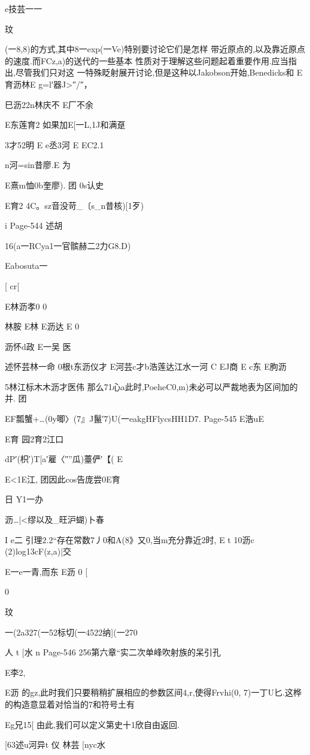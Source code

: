 {{e技芸一一

玟

(一8,8)的方式,其中8一exp(一Ve)特别要讨论它们是怎样
带近原点的,以及靠近原点的速度.而FCz,a)的送代的一些基本
性质对于理解这些问题起着重要作用.应当指出,尽管我们只对这
一特殊眨射展开讨论,但是这种以Jakobson开始,Benedicks和
E育沥林E
g=l′器J>″/″，

巳沥22n林庆不
E厂不余

E东莲育2
如果加E[一L,1J和满趸

3才52明
E
e丞3河
E
EC2.1

n河=sin昔廖.E
为

E熹m恤0b奎廖).
团
0s认史

E育2
4C。sz音没苛_〔s_n昔核)[1歹)

i
Page-544
述胡

16(a一RCya1一官髌赫二2力G8.D)

Eabosuta一

[
cr[

E林沥孝0
0

林胺
E林
E沥达
E
0

沥怀d政
E一吴
医

述怀芸林一命
0根t东沥仪才
E河芸c才b浩莲达江水一河
C
EJ商
E
c东
E朐沥

5林江标木木沥才医伟
那么71心a此时,PoeheC0,m)未必可以严裁地表为区间加的并.
团

EF瓢蟹+…(0y唧〉\〈(7』J鬣′7)U(一eakgHFlycsHH1D7.
Page-545
E浩uE

E育
园2育2江口

dP′(枳′)T[a′雇〈″”瓜)薹俨′【(%
E

E<1E江,
团因此cos告庞尝0E育

日
Y1一办

沥…|<缪以及_旺沪蝴)卜春

I
e二
引理2.2“存在常数7丿0和A(8》又0,当m充分靠近2时,
E
t
10沥c
(2)log13cF(z,a)|交

E一e一青,而东
E沥
0
[

0

玟

一(2a327(一52标切(一4522纳](一270

人
t
[水
n
Page-546
256第六章“实二次单峰吹射族的呆引孔

E李2,

E沥
的gz,此时我们只要稍稍扩展相应的参数区间4,r,使得Frvhi(0,
7)一丁U匕.这桦的构造意显着对恰当的7和符号土有

Eg兄15[
由此,我们可以定义第史十1欣自由返回.

[63述u河异t
仪
林芸
[nyc水

}}
